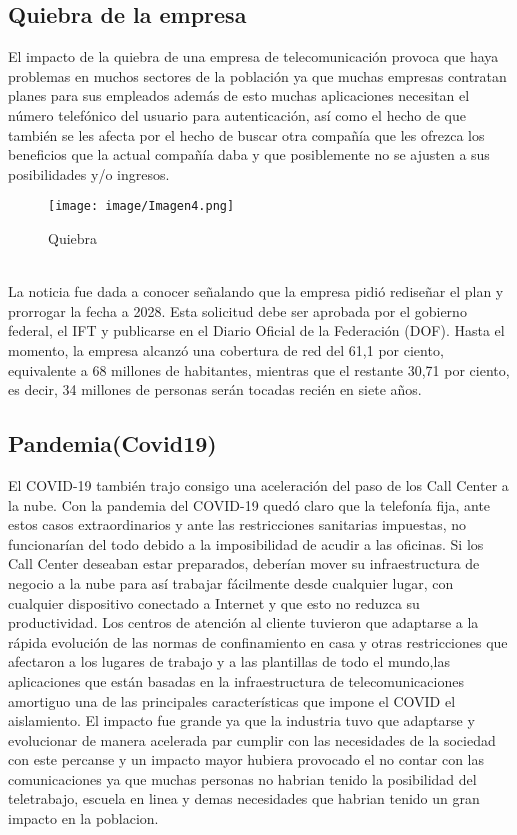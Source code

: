\documentclass[conference]{IEEEtran}
\begin{document}
\subsection{Quiebra de la empresa}

El impacto de la quiebra de una empresa de telecomunicación provoca que haya problemas en muchos sectores de la población ya que muchas empresas contratan planes para sus empleados además de esto muchas aplicaciones necesitan el número telefónico del usuario para autenticación, así como el hecho de que también se les afecta por el hecho de buscar otra compañía que les ofrezca los beneficios que la actual compañía daba y que posiblemente no se ajusten a sus posibilidades y/o ingresos.\\
\begin{figure}[htbp]
    \begin{center}
    \texttt{[image: image/Imagen4.png]}
    \caption{Quiebra}
\label{fig1}
    \end{center}
\end{figure} 
\\
La noticia fue dada a conocer señalando que la empresa pidió rediseñar el plan y prorrogar la fecha a 2028. Esta solicitud debe ser aprobada por el gobierno federal, el IFT y publicarse en el Diario Oficial de la Federación (DOF). Hasta el momento, la empresa alcanzó una cobertura de red del 61,1 por ciento, equivalente a 68 millones de habitantes, mientras que el restante 30,71 por ciento, es decir, 34 millones de personas serán tocadas recién en siete años.
\subsection{Pandemia(Covid19)}\label{SCM}
El COVID-19 también trajo consigo una aceleración del paso de los Call Center a la nube. Con la pandemia del COVID-19 quedó claro que la telefonía fija, ante estos casos extraordinarios y ante las restricciones sanitarias impuestas, no funcionarían del todo debido a la imposibilidad de acudir a las oficinas. Si los Call Center deseaban estar preparados, deberían mover su infraestructura de negocio a la nube para así trabajar fácilmente desde cualquier lugar, con cualquier dispositivo conectado a Internet y que esto no reduzca su productividad.  
Los centros de atención al cliente tuvieron que adaptarse a la rápida evolución de las normas de confinamiento en casa y otras restricciones que afectaron a los lugares de trabajo y a las plantillas de todo el mundo,las aplicaciones que están basadas en la infraestructura de telecomunicaciones amortiguo una de las principales características que impone el COVID el aislamiento.
El impacto fue grande ya que la industria tuvo que adaptarse y evolucionar de manera acelerada par cumplir con las necesidades de la sociedad con este percanse y un impacto mayor hubiera provocado el no contar con las comunicaciones ya que muchas personas no habrian tenido la posibilidad del teletrabajo, escuela en linea y demas necesidades que habrian tenido un gran impacto en la poblacion.
\end{document}

